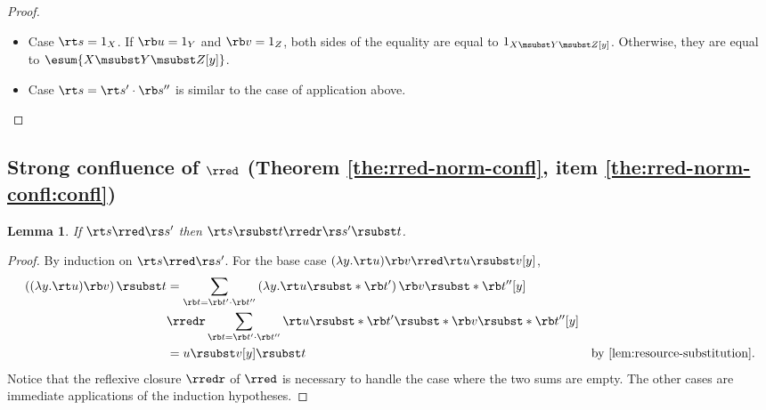 \documentclass[10pt,a4paper]{amsart}
\newtheorem{lemma}[theorem]{Lemma}
\theoremstyle{definition}
\begin{document}
\begin{proof}
\begin{itemize}
\begin{itemize}
\begin{align*}
				\rt s' \rsubst* {\rb v'_l} [y]
				\rsubst*{ \rb u \rsubst* {\rb v''_l}[y] }
				\rb s'' \rsubst* {\rb v_r} [y] \\
			\shortintertext{by the induction hypothesis on $\rt s'$,}
			& = \sum_{\rb v = (\rb v'_l \cdot \rb v_r) \cdot \rb v''_l}
				\rt s \rsubst* {\rb v'_l \cdot \rb v_r} [y]
				\rsubst* { \rb u \rsubst* {\rb v''_l}[y] }
			\end{align*}
			by re-arranging the indices,
			and using again \cref{lem:rsubst-x-notin-fv}
			together with the hypotheses
			$x \notin Z$ and $x \notin \fv(\rb s'')$.
			This is exactly the desired result.
		\item The case $x \notin \fv(\rt s)$ and $x \in \fv(\rb s'')$
			is symmetric.
		\end{itemize}
	\item Case $\rt s = 1_X$.
		If $\rb u = 1_Y$ and $\rb v = 1_Z$,
		both sides of the equality are equal to
		$1_{X \msubst Y \msubst Z [y]}$.
		Otherwise, they are equal to
		$\esum{X \msubst Y \msubst Z [y]}$.
	\item Case $\rt s = \rt s' \cdot \rb s''$
		is similar to the case of application above.
	\qedhere
	\end{itemize}
	\end{proof}


\subsection{Strong confluence of \texorpdfstring{$\rred$}{→r}
(Theorem \ref{the:rred-norm-confl}, item \ref{the:rred-norm-confl:confl})}

\begin{lemma} \label{lem:rred-and-subst-1}
	If $\rt s \rred \rs s'$ then 
	$\rt s \rsubst t \rredr \rs s' \rsubst t$.
\end{lemma}
	
	\begin{proof}
	By induction on $\rt s \rred \rs s'$.
	For the base case $(\ensuremath{\lambda}y.\rt u)\rb v \rred \rt u \rsubst v [y]$,
	\begin{align*}
		\left( (\ensuremath{\lambda}y.\rt u)\rb v \right) \rsubst t
		& = \sum_{\rb t = \rb t' \cdot \rb t''}
			\left( \ensuremath{\lambda}y.\rt u \rsubst* {\rb t'} \right)
			\rb v \rsubst* {\rb t''} [y] \\
		& \rredr \sum_{\rb t = \rb t' \cdot \rb t''}
			\rt u \rsubst* {\rb t'}
			\rsubst*{ \rb v \rsubst* {\rb t''} } [y] \\
		& = u \rsubst v [y] \rsubst t
			& \text{by \cref{lem:resource-substitution}.}
	\end{align*}
	Notice that the reflexive closure $\rredr$ of $\rred$
	is necessary to handle the case where the two sums
	are empty.
	The other cases are immediate applications 
	of the induction hypotheses.
	\end{proof}
\end{document}
